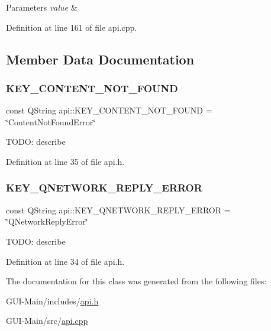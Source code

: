 \begin{DoxyParams}{Parameters}
{\em value} & \\
\hline
\end{DoxyParams}


Definition at line 161 of file api.\+cpp.



\subsection{Member Data Documentation}
\mbox{\label{classapi_a027285454c3fa18bdab800db4ec9a632}} 
\subsubsection{\texorpdfstring{K\+E\+Y\+\_\+\+C\+O\+N\+T\+E\+N\+T\+\_\+\+N\+O\+T\+\_\+\+F\+O\+U\+ND}{KEY\_CONTENT\_NOT\_FOUND}}
{\footnotesize\ttfamily const Q\+String api\+::\+K\+E\+Y\+\_\+\+C\+O\+N\+T\+E\+N\+T\+\_\+\+N\+O\+T\+\_\+\+F\+O\+U\+ND = \char`\"{}Content\+Not\+Found\+Error\char`\"{}\hspace{0.3cm}{\ttfamily [static]}}

T\+O\+DO\+: describe 

Definition at line 35 of file api.\+h.

\mbox{\label{classapi_a697932895aadaf71414e4a12c9edc339}} 
\subsubsection{\texorpdfstring{K\+E\+Y\+\_\+\+Q\+N\+E\+T\+W\+O\+R\+K\+\_\+\+R\+E\+P\+L\+Y\+\_\+\+E\+R\+R\+OR}{KEY\_QNETWORK\_REPLY\_ERROR}}
{\footnotesize\ttfamily const Q\+String api\+::\+K\+E\+Y\+\_\+\+Q\+N\+E\+T\+W\+O\+R\+K\+\_\+\+R\+E\+P\+L\+Y\+\_\+\+E\+R\+R\+OR = \char`\"{}Q\+Network\+Reply\+Error\char`\"{}\hspace{0.3cm}{\ttfamily [static]}}

T\+O\+DO\+: describe 

Definition at line 34 of file api.\+h.



The documentation for this class was generated from the following files\+:\begin{DoxyCompactItemize}
\item 
G\+U\+I-\/\+Main/includes/\hyperlink{api_8h}{api.\+h}\item 
G\+U\+I-\/\+Main/src/\hyperlink{api_8cpp}{api.\+cpp}\end{DoxyCompactItemize}
